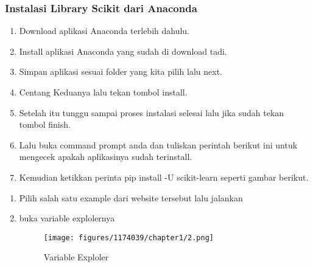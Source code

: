             \subsubsection{Instalasi Library Scikit dari Anaconda}
            \begin{enumerate}
                \item Download aplikasi Anaconda terlebih dahulu. 
                \item Install aplikasi Anaconda yang sudah di download tadi. 
                \item Simpan aplikasi sesuai folder yang kita pilih lalu next. 
                \item Centang Keduanya lalu tekan tombol install. 
                \item Setelah itu tunggu sampai proses instalasi selesai lalu jika sudah tekan tombol finish. 
                \item Lalu buka command prompt anda dan tuliskan perintah berikut ini untuk mengecek apakah aplikasinya sudah   terinstall. 
                \item Kemudian ketikkan perinta pip install -U scikit-learn seperti gambar berikut. 
            \end{enumerate}
			\begin{enumerate}
             \begin{figure}[H]
                \texttt{[image: figures/1174039/chapter1/1.png]}
                \centering
                \caption{Instalasi}
            \end{figure}
            \item Pilih salah satu example dari website tersebut lalu jalankan \hfill \break 

                \item buka variable explolernya
                \begin{figure}[H]
                    \texttt{[image: figures/1174039/chapter1/2.png]}
                    \centering
                    \caption{Variable Exploler}
                \end{figure}
			\end{enumerate}

